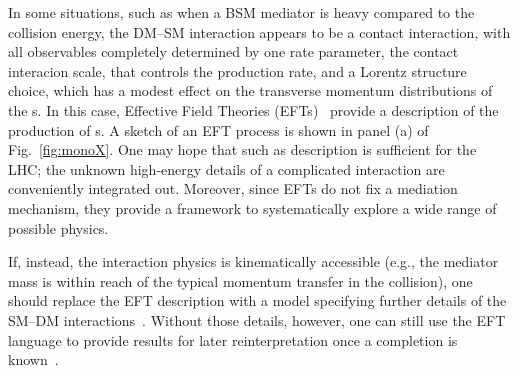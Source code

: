 
In some situations, such as when a BSM mediator is heavy compared to the collision energy, the DM--SM interaction appears to be a contact interaction, with all observables completely determined by one rate parameter, the contact interacion scale, that controls the production rate, and a Lorentz structure choice, which has a modest effect on the transverse momentum distributions of the {\IP}s.
In this case, Effective Field Theories (EFTs)~\cite{Goodman:2010ku,Bai:2010hh,Fox:2011pm} provide a description of the production of {\IP}s.
A sketch of an EFT process is shown in panel (a) of Fig.~\ref{fig:monoX}.
One may hope that such as description is sufficient for the LHC; the unknown high-energy details of a complicated interaction are conveniently integrated out.
Moreover, since EFTs do not fix a mediation mechanism, they provide a framework to systematically explore a wide range of possible physics.


If, instead, the interaction physics is kinematically accessible (e.g., the mediator mass is within reach of the typical momentum transfer in the collision), one should replace the EFT description with a model specifying further details of the SM--DM interactions~\cite{Shoemaker:2011vi}.
Without those details, however, one can still use the EFT language to provide results for later reinterpretation once a completion is known~\cite{Racco:2015dxa,Busoni:2013lha}. 


